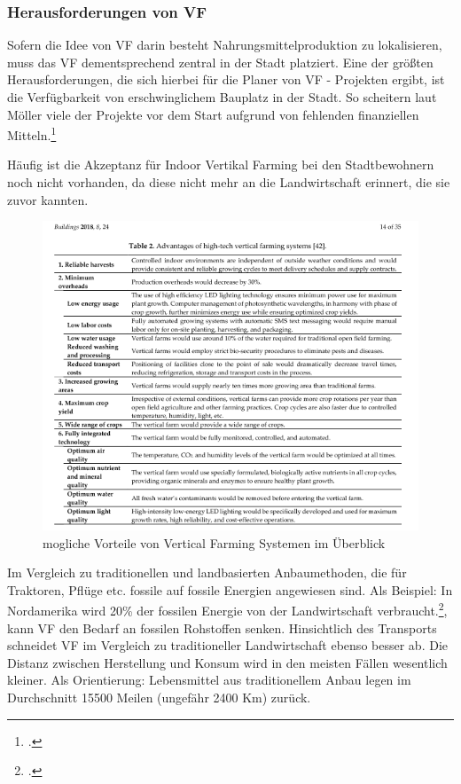 \documentclass{scrartcl}
\begin{document}
\subsubsection{Herausforderungen von VF}

Sofern die Idee von VF darin besteht Nahrungsmittelproduktion zu lokalisieren, muss das VF dementsprechend zentral in der Stadt platziert. Eine der größten Herausforderungen, die sich hierbei für die Planer von VF - Projekten ergibt, ist die Verfügbarkeit von erschwinglichem Bauplatz in der Stadt. So scheitern laut Möller viele der Projekte vor dem Start aufgrund von fehlenden finanziellen Mitteln.\footcite[S.8]{PeterMollerVoss2013VerticalRise}

Häufig ist die Akzeptanz für Indoor Vertikal Farming bei den Stadtbewohnern noch nicht vorhanden, da diese nicht mehr an die Landwirtschaft erinnert, die sie zuvor kannten.


\begin{figure}[htbp]
\centering
\includegraphics[width=14cm]{image_folder/moglicheVorteileVonVF.png}
\caption{mogliche Vorteile von Vertical Farming Systemen im Überblick}
\label{fig:vorteileVF}
\end{figure}

Im Vergleich zu traditionellen und landbasierten Anbaumethoden, die für Traktoren, Pflüge etc. fossile auf fossile Energien angewiesen sind. Als Beispiel: In Nordamerika wird 20\% der fossilen Energie von der Landwirtschaft verbraucht.\footcite[Vgl.][S.27]{Al-Kodmany2018TheCity[82,83}, kann VF den Bedarf an fossilen Rohstoffen senken.
Hinsichtlich des Transports schneidet VF im Vergleich zu traditioneller Landwirtschaft ebenso besser ab. Die Distanz zwischen Herstellung und Konsum wird in den meisten Fällen wesentlich kleiner. Als Orientierung: Lebensmittel aus traditionellem Anbau legen im Durchschnitt 15500 Meilen (ungefähr 2400 Km) zurück.
\end{document}
